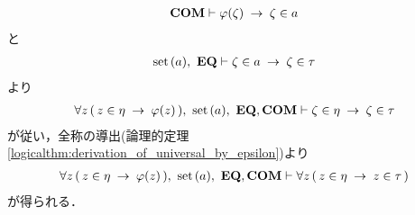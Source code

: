 \begin{sketch}
\begin{description}
\begin{itemize}
\begin{align}
							\mbox{\bf COM} \vdash \varphi(\zeta) \hspace{0.25em}\rightarrow\hspace{0.25em} \zeta \in a
						\end{align}
						と
						\begin{align}
							\operatorname*{set}\hspace{0.15em}(a),\ \mbox{{\bf EQ}} \vdash \zeta \in a \hspace{0.25em}\rightarrow\hspace{0.25em} \zeta \in \tau
						\end{align}
						より
						\begin{align}
							\forall z\, (\, z \in \eta \rarrow \varphi(z)\, ),\ 
							\set{a},\ \EQAX,\COMAX
							\vdash \zeta \in \eta \rarrow \zeta \in \tau
						\end{align}
						が従い，全称の導出(論理的定理\ref{logicalthm:derivation_of_universal_by_epsilon})より
						\begin{align}
							\forall z\, (\, z \in \eta \rarrow \varphi(z)\, ),\ 
							\set{a},\ \EQAX,\COMAX \vdash 
							\forall z\, (\, z \in \eta \rarrow z \in \tau\, )
						\end{align}
						が得られる．
					

\end{itemize}
\end{description}
\end{sketch}

